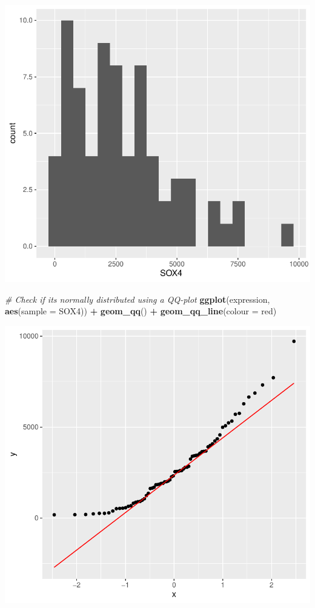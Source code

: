 \documentclass[
]{book}
\newenvironment{Shaded}{\begin{snugshade}}{\end{snugshade}}
\newcommand{\AttributeTok}[1]{\textcolor[rgb]{0.13,0.29,0.53}{#1}}
\newcommand{\CommentTok}[1]{\textcolor[rgb]{0.56,0.35,0.01}{\textit{#1}}}
\newcommand{\FunctionTok}[1]{\textcolor[rgb]{0.13,0.29,0.53}{\textbf{#1}}}
\newcommand{\NormalTok}[1]{#1}
\newcommand{\SpecialCharTok}[1]{\textcolor[rgb]{0.81,0.36,0.00}{\textbf{#1}}}
\newcommand{\StringTok}[1]{\textcolor[rgb]{0.31,0.60,0.02}{#1}}
\begin{document}
\includegraphics{_main_files/figure-latex/unnamed-chunk-131-1.pdf}

\begin{Shaded}
\begin{Highlighting}[]
\CommentTok{\# Check if it\textquotesingle{}s normally distributed using a QQ{-}plot }
\FunctionTok{ggplot}\NormalTok{(expression,}
       \FunctionTok{aes}\NormalTok{(}\AttributeTok{sample =}\NormalTok{ SOX4)) }\SpecialCharTok{+}
  \FunctionTok{geom\_qq}\NormalTok{() }\SpecialCharTok{+}
  \FunctionTok{geom\_qq\_line}\NormalTok{(}\AttributeTok{colour =} \StringTok{\textquotesingle{}red\textquotesingle{}}\NormalTok{)}
\end{Highlighting}
\end{Shaded}

\includegraphics{_main_files/figure-latex/unnamed-chunk-131-2.pdf}
\end{document}
